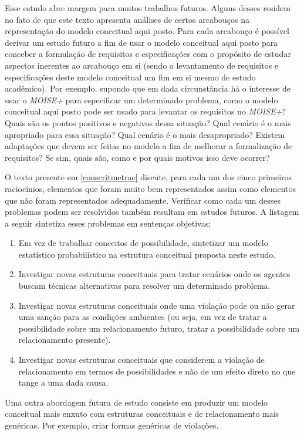 Esse estudo abre margem para muitos trabalhos futuros. Alguns desses residem no fato de que este texto apresenta análises de certos arcabouços na representação do modelo conceitual aqui posto. Para cada arcabouço é possível derivar um estudo futuro a fim de usar o modelo conceitual aqui posto para conceber a formulação de requisitos e especificações com o propósito de estudar aspectos inerentes ao arcabouço em si (sendo o levantamento de requisitos e especificações deste modelo conceitual um fim em si mesmo de estudo acadêmico). Por exemplo, supondo que em dada circunstância há o interesse de usar o \textit{MOISE+} para especificar um determinado problema, como o modelo conceitual aqui posto pode ser usado para levantar os requisitos no \textit{MOISE+}? Quais são os pontos positivos e negativos dessa situação? Qual cenário é o mais apropriado para essa situação? Qual cenário é o mais desapropriado? Existem adaptações que devem ser feitas no modelo a fim de melhorar a formalização de requisitos? Se sim, quais são, como e por quais motivos isso deve ocorrer? 

O texto presente em \ref{conscritmetrac} discute, para cada um dos cinco primeiros raciocínios, elementos que foram muito bem representados assim como elementos que não foram representados adequadamente. Verificar como cada um desses problemas podem ser resolvidos também resultam em estudos futuros. A listagem a seguir sintetiza esses problemas em sentenças objetivas; 

\begin{enumerate}
    \item Em vez de trabalhar conceitos de possibilidade, sintetizar um modelo estatístico probabilístico na estrutura conceitual proposta neste estudo.
    \item Investigar novas estruturas conceituais para tratar cenários onde os agentes buscam técnicas alternativas para resolver um determinado problema. 
    \item Investigar novas estruturas conceituais onde uma violação pode ou não gerar uma sanção para as condições ambientes (ou seja, em vez de tratar a possibilidade sobre um relacionamento futuro, tratar a possibilidade sobre um relacionamento presente).
    \item Investigar novas estruturas conceituais que considerem a violação de relacionamento em termos de possibilidades e não de um efeito direto no que tange a uma dada causa.   
\end{enumerate}

Uma outra abordagem futura de estudo consiste em produzir um modelo conceitual mais enxuto com estruturas conceituais e de relacionamento mais genéricas. Por exemplo, criar formas genéricas de violações.